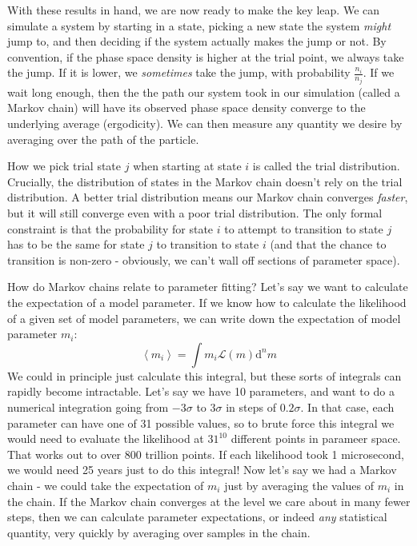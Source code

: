 \documentclass[letterpaper,11pt,preprint]{aastex}
\begin{document}
With these results in hand, we are now ready to make the key leap.  We
can simulate a system by starting in a state, picking a new state the
system \textit{might} jump to, and then deciding if the system
actually makes the jump or not.  By convention, if the phase space
density is higher at the trial point, we always take the jump.  If it
is lower, we \textit{sometimes} take the jump, with probability
$\frac{n_i}{n_j}$.  If we wait long enough, then the the path our
system took in our simulation (called a Markov chain) will have its
observed phase space density converge to the underlying average
(ergodicity).  We can then measure any quantity we desire by averaging
over the path of the particle.  

How we pick trial state $j$ when starting at state $i$ is called the trial
distribution.  Crucially, the distribution of states in the Markov
chain doesn't rely on the trial distribution.  A better trial
distribution means our Markov chain converges \textit{faster}, but it
will still converge even with a poor trial distribution.  The only
formal constraint is that the probability for state $i$ to attempt to
transition to state $j$ has to be the same for state $j$ to transition
to state $i$ (and that the chance to transition is non-zero -
obviously, we can't wall off sections of parameter space).

How do Markov chains relate to parameter fitting?  Let's say we want
to calculate the expectation of a model parameter.  If we know how to
calculate the likelihood of a given set of model parameters, we can
write down the expectation of model parameter $m_i$:
$$\left < m_i \right > = \int m_i \mathcal{L}(m)\mathrm{d}^nm$$
We could in principle just calculate this integral, but these sorts of
integrals can rapidly become intractable.  Let's say we have 10
parameters, and want to do a numerical integration going from
$-3\sigma$ to $3\sigma$ in steps of $0.2 \sigma$.  In that case, each
parameter can have one of 31 possible values, so to brute force this
integral we would need to evaluate the likelihood at $31^{10}$
different points in parameer space.  That works out to over 800
trillion points.  If each likelihood took 1 microsecond, we would need
25 years just to do this integral!  Now let's say we had a Markov
chain - we could take the expectation of $m_i$ just by averaging the
values of $m_i$ in the chain.  If the Markov chain converges at the
level we care about in many fewer steps, then we can calculate
parameter expectations, or indeed \textit{any} statistical quantity,
very quickly by averaging over samples in the chain.
\end{document}
